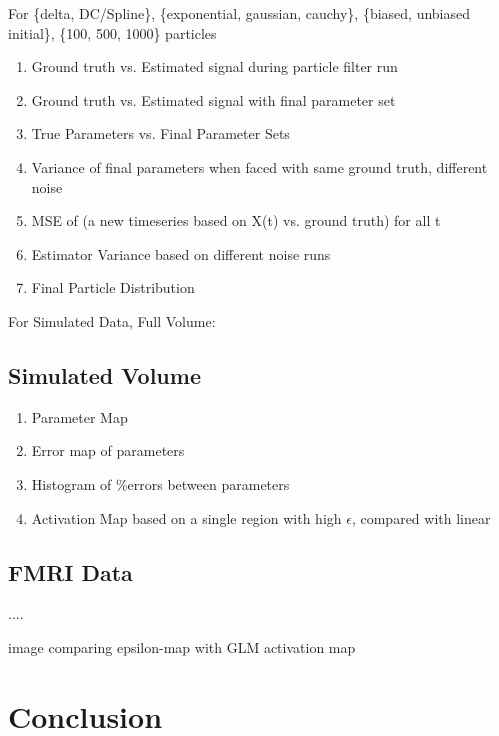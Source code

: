 \documentclass{article}
\begin{document}
For \{delta, DC/Spline\}, \{exponential, gaussian, cauchy\}, \{biased, unbiased initial\},
\{100, 500, 1000\} particles
\begin{enumerate}
\item Ground truth vs. Estimated signal during particle filter run
\item Ground truth vs. Estimated signal with final parameter set
\item True Parameters vs. Final Parameter Sets
\item Variance of final parameters when faced with same ground truth, different noise
\item MSE of (a new timeseries based on X(t) vs. ground truth) for all t
\item Estimator Variance based on different noise runs
\item Final Particle Distribution
\end{enumerate}

For Simulated Data, Full Volume:

\subsection{Simulated Volume}
\begin{enumerate}
\item Parameter Map 
\item Error map of parameters
\item Histogram of \%errors between parameters
\item Activation Map based on a single region with high $\epsilon$, compared with linear
\end{enumerate}

\subsection{FMRI Data}
....

image comparing epsilon-map with GLM activation map

\section{Conclusion}


%
%

\end{document}
